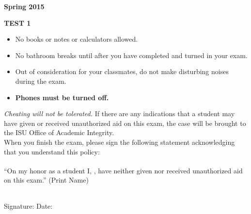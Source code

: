 \documentclass[fleqn,12pt]{article}
\newcommand{\<}{\ensuremath{\langle}}
\renewcommand{\>}{\ensuremath{\rangle}}
\begin{document}
\pagestyle{empty}
{}
\hfill {\bf Spring 2015}
\begin{center}
  {\bf TEST 1}
  \thispagestyle{empty}
\end{center}
\vskip1cm
\begin{itemize}
\item No books or notes or calculators allowed.
\item No bathroom breaks until after you have completed and turned in your exam.
\item Out of consideration for your classmates, do not make
  disturbing noises during the exam.
\item {\bf Phones must be turned off.}
\end{itemize}
\vskip1cm
    {\it Cheating will not be tolerated.}  If there are any indications that a
    student may have given or received unauthorized aid on this exam, the case 
    will be brought to the ISU Office of Academic Integrity.%
    \\
    When you finish the exam, please sign the following statement acknowledging that you understand 
    this policy:\\
    \\
    ``On my honor as a student I,
    \underline{\phantom{XXXXXXXXXXXXXXXX}}, have neither
    given nor received unauthorized aid on this exam.''
    \hbox{} \hskip 1cm {\small (Print Name)}\\
    \\
    \begin{flushright} Signature: \underline{\phantom{XXXXXXXXXXXXXXXXXXXXXXXX}}
      Date: \underline{\phantom{XXXXXXXXXX}}
    \end{flushright}


    \newpage
\end{document}
